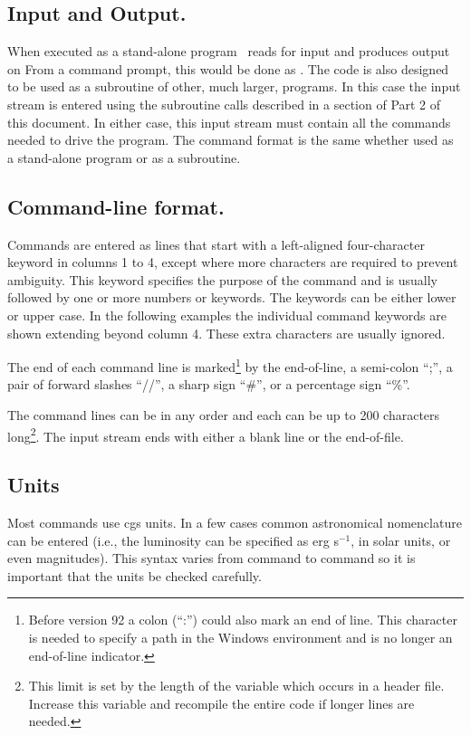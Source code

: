 \subsection{Input and Output.}
When executed as a stand-alone program \Cloudy\ reads
 for input and produces output on 
From a command prompt, this
would be done as .
The code is also designed
to be used as a subroutine of other, much larger, programs.
In this case the input stream is entered using
the subroutine calls described in a section of Part 2 of this document.
In either case, this input stream must contain all the commands needed to
drive the program.
The command format is the same whether used as a
stand-alone program or as a subroutine.

\subsection{Command-line format.}
Commands are entered as lines that start with
a left-aligned four-character keyword in columns 1 to 4, except where more
characters are required to prevent ambiguity.
This keyword
specifies the purpose of the command and is usually followed by one or more
numbers or keywords.
The keywords can be either lower or upper case.
In the following examples the individual command keywords are shown extending
beyond column 4.
These extra characters are usually ignored.

The end of each command line is marked\footnote{Before version 92 a colon (``:'') could also mark an end of line.
This character is needed to specify a path in the Windows environment and
is no longer an end-of-line indicator.} by the end-of-line, a semi-colon
``;'', a pair of forward slashes ``//'', a sharp sign ``\#'', or a percentage
sign ``\%''.

The command lines can be in any order and each can be up to 200 characters
long\footnote{This limit is set by the length of the variable
which occurs in a header file.  Increase this variable and recompile the
entire code if longer lines are needed.}.   The input stream ends with either a blank line or the end-of-file.

\subsection{Units}
Most commands use cgs units.
In a few cases common astronomical
nomenclature can be entered (i.e., the luminosity can be specified
as erg s$^{-1}$, in solar units, or even magnitudes).
This syntax varies from command
to command so it is important that the units be checked carefully.

